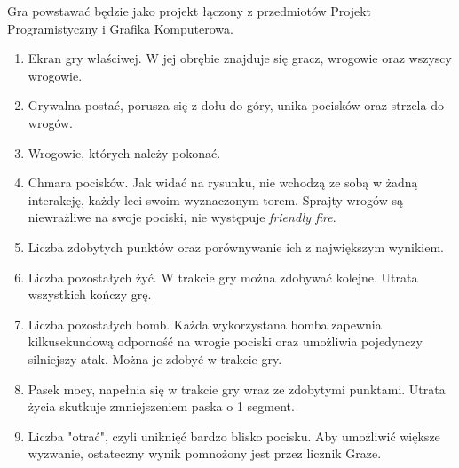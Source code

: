 \documentclass[a4paper,twoside]{article}
\begin{document}
Gra powstawać będzie jako projekt łączony z przedmiotów Projekt Programistyczny i Grafika Komputerowa.


\begin{center}
	\vspace{5pt}
\end{center}
\begin{enumerate}
	\item Ekran gry właściwej. W jej obrębie znajduje się gracz, wrogowie oraz wszyscy wrogowie. 
	\item Grywalna postać, porusza się z dołu do góry, unika pocisków oraz strzela do wrogów.
	\item Wrogowie, których należy pokonać.
	\item Chmara pocisków. Jak widać na rysunku, nie wchodzą ze sobą w żadną interakcję, każdy leci swoim wyznaczonym torem. Sprajty wrogów są niewrażliwe na swoje pociski, nie występuje \textit{friendly fire}.
	\item Liczba zdobytych punktów oraz porównywanie ich z największym wynikiem.
	\item Liczba pozostałych żyć. W trakcie gry można zdobywać kolejne. Utrata wszystkich kończy grę.
	\item Liczba pozostałych bomb. Każda wykorzystana bomba zapewnia kilkusekundową odporność na wrogie pociski oraz umożliwia pojedynczy silniejszy atak. Można je zdobyć w trakcie gry.
	\item Pasek mocy, napełnia się w trakcie gry wraz ze zdobytymi punktami. Utrata życia skutkuje zmniejszeniem paska o 1 segment.
	\item Liczba "otrać", czyli uniknięć bardzo blisko pocisku. Aby umożliwić większe wyzwanie, ostateczny wynik pomnożony jest przez licznik Graze.
\end{enumerate}
\end{document}
